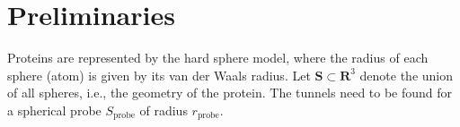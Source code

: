 \documentclass{llncs}
\def\qrand{q_{rand}}
\def\C{\mathcal{C}}
\def\probe{r_{\mathrm{probe}}}
\def\Sprobe{S_{\mathrm{probe}}}
\def\SS{\mathbf{S}}
\def\gb{p_{c}}
\begin{document}

%
%
%


\section{Preliminaries}

Proteins are represented by the hard sphere model, where the radius of each sphere (atom) is given by its van der Waals radius.
Let $\SS \subset \mathbf{R}^3$ denote the union of all spheres, i.e., the geometry of the protein.
The tunnels need to be found for a spherical probe $\Sprobe$ of radius $\probe$.
\end{document}
